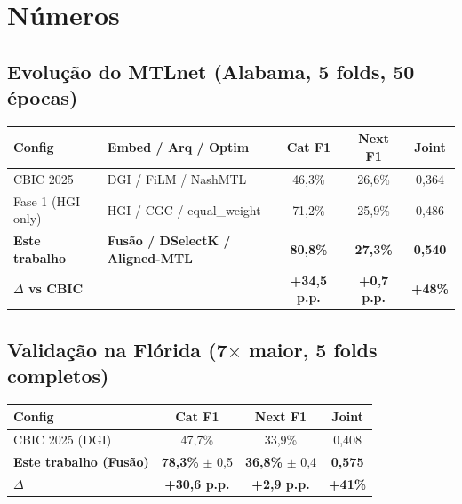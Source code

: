 \documentclass[12pt,a4paper]{article}
\begin{document}
\section{Números}

\subsection{Evolução do MTLnet (Alabama, 5 folds, 50 épocas)}

\begin{table}[H]
\centering
\small
\begin{tabular}{llccc}
\toprule
\textbf{Config} & \textbf{Embed / Arq / Optim} & \textbf{Cat F1} & \textbf{Next F1} & \textbf{Joint} \\
\midrule
CBIC 2025 & DGI / FiLM / NashMTL & 46,3\% & 26,6\% & 0,364 \\
Fase 1 (HGI only) & HGI / CGC / equal\_weight & 71,2\% & 25,9\% & 0,486 \\
\textbf{Este trabalho} & \textbf{Fusão / DSelectK / Aligned-MTL} & \textbf{80,8\%} & \textbf{27,3\%} & \textbf{0,540} \\
\midrule
\multicolumn{2}{l}{\textbf{$\Delta$ vs CBIC}} & \textbf{+34,5 p.p.} & \textbf{+0,7 p.p.} & \textbf{+48\%} \\
\bottomrule
\end{tabular}
\end{table}

\subsection{Validação na Flórida (7$\times$ maior, 5 folds completos)}

\begin{table}[H]
\centering
\small
\begin{tabular}{lccc}
\toprule
\textbf{Config} & \textbf{Cat F1} & \textbf{Next F1} & \textbf{Joint} \\
\midrule
CBIC 2025 (DGI) & 47,7\% & 33,9\% & 0,408 \\
\textbf{Este trabalho (Fusão)} & \textbf{78,3\%} $\pm$ 0,5 & \textbf{36,8\%} $\pm$ 0,4 & \textbf{0,575} \\
\midrule
\textbf{$\Delta$} & \textbf{+30,6 p.p.} & \textbf{+2,9 p.p.} & \textbf{+41\%} \\
\bottomrule
\end{tabular}
\end{table}
\end{document}
